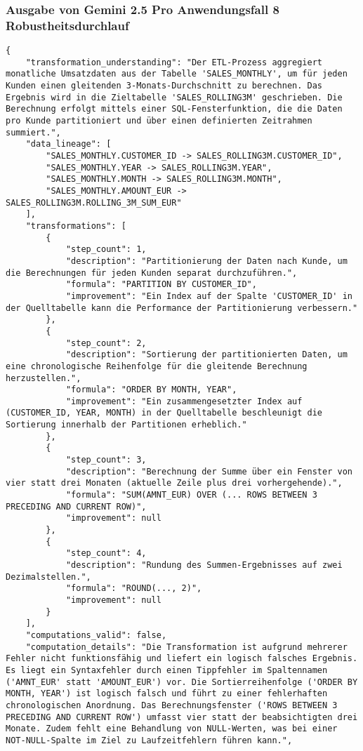 \subsubsection{Ausgabe von Gemini 2.5 Pro Anwendungsfall 8 Robustheitsdurchlauf}\label{anhang:subsubsec:gemini_case8_prompt3}
\begin{lstlisting}[caption={Ausgabe: Gemini 2.5 Pro Anwendungsfall 8 Robustheitsdurchlauf},label={gemini_case8_prompt3}]
{
    "transformation_understanding": "Der ETL-Prozess aggregiert monatliche Umsatzdaten aus der Tabelle 'SALES_MONTHLY', um für jeden Kunden einen gleitenden 3-Monats-Durchschnitt zu berechnen. Das Ergebnis wird in die Zieltabelle 'SALES_ROLLING3M' geschrieben. Die Berechnung erfolgt mittels einer SQL-Fensterfunktion, die die Daten pro Kunde partitioniert und über einen definierten Zeitrahmen summiert.",
    "data_lineage": [
        "SALES_MONTHLY.CUSTOMER_ID -> SALES_ROLLING3M.CUSTOMER_ID",
        "SALES_MONTHLY.YEAR -> SALES_ROLLING3M.YEAR",
        "SALES_MONTHLY.MONTH -> SALES_ROLLING3M.MONTH",
        "SALES_MONTHLY.AMOUNT_EUR -> SALES_ROLLING3M.ROLLING_3M_SUM_EUR"
    ],
    "transformations": [
        {
            "step_count": 1,
            "description": "Partitionierung der Daten nach Kunde, um die Berechnungen für jeden Kunden separat durchzuführen.",
            "formula": "PARTITION BY CUSTOMER_ID",
            "improvement": "Ein Index auf der Spalte 'CUSTOMER_ID' in der Quelltabelle kann die Performance der Partitionierung verbessern."
        },
        {
            "step_count": 2,
            "description": "Sortierung der partitionierten Daten, um eine chronologische Reihenfolge für die gleitende Berechnung herzustellen.",
            "formula": "ORDER BY MONTH, YEAR",
            "improvement": "Ein zusammengesetzter Index auf (CUSTOMER_ID, YEAR, MONTH) in der Quelltabelle beschleunigt die Sortierung innerhalb der Partitionen erheblich."
        },
        {
            "step_count": 3,
            "description": "Berechnung der Summe über ein Fenster von vier statt drei Monaten (aktuelle Zeile plus drei vorhergehende).",
            "formula": "SUM(AMNT_EUR) OVER (... ROWS BETWEEN 3 PRECEDING AND CURRENT ROW)",
            "improvement": null
        },
        {
            "step_count": 4,
            "description": "Rundung des Summen-Ergebnisses auf zwei Dezimalstellen.",
            "formula": "ROUND(..., 2)",
            "improvement": null
        }
    ],
    "computations_valid": false,
    "computation_details": "Die Transformation ist aufgrund mehrerer Fehler nicht funktionsfähig und liefert ein logisch falsches Ergebnis. Es liegt ein Syntaxfehler durch einen Tippfehler im Spaltennamen ('AMNT_EUR' statt 'AMOUNT_EUR') vor. Die Sortierreihenfolge ('ORDER BY MONTH, YEAR') ist logisch falsch und führt zu einer fehlerhaften chronologischen Anordnung. Das Berechnungsfenster ('ROWS BETWEEN 3 PRECEDING AND CURRENT ROW') umfasst vier statt der beabsichtigten drei Monate. Zudem fehlt eine Behandlung von NULL-Werten, was bei einer NOT-NULL-Spalte im Ziel zu Laufzeitfehlern führen kann.",

\end{lstlisting}
